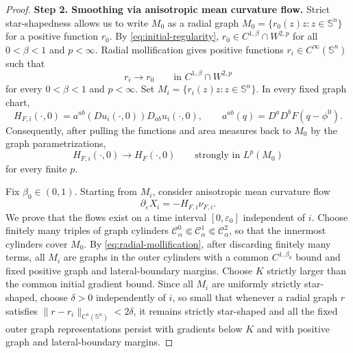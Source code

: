 \documentclass[11pt,reqno]{amsart}
\theoremstyle{definition}
\theoremstyle{remark}
\numberwithin{equation}{section}
\begin{document}
\begin{proof}
\medskip
\noindent
\textbf{Step 2. Smoothing via anisotropic mean curvature flow.}
Strict star-shapedness allows us to write $M_0$ as a radial graph $M_0=\{r_0(z)z:z\in\mathbb S^n\}$  for a positive function $r_0$. By \eqref{eq:initial-regularity}, $r_0\in C^{1,\beta}\cap W^{2,p}$ for all $0<\beta<1$ and $p<\infty$. Radial mollification gives positive functions $r_i\in C^\infty(\mathbb S^n)$ such that
\begin{equation}
\label{eq:radial-mollification}
 r_i\longrightarrow r_0
 \qquad\text{in }C^{1,\beta}\cap W^{2,p}
\end{equation}
for every $0<\beta<1$ and $p<\infty$. Set $M_i=\{r_i(z)z:z\in\mathbb S^n\}$. In every fixed graph chart,
\begin{equation*}
 H_{F,i}(\cdot,0)=a^{ab}(Du_i(\cdot,0))D_{ab}u_i(\cdot,0),
 \qquad
 a^{ab}(q)=D^aD^bF(q-\phi^0).
\end{equation*}
Consequently, after pulling the functions and area measures back to $M_0$ by the graph parametrizations,
\begin{equation}
\label{eq:initial-H-strong}
 H_{F,i}(\cdot,0)\longrightarrow H_F(\cdot,0)
 \qquad\text{strongly in }L^p(M_0)
\end{equation}
for every finite $p$.

Fix $\beta_0\in(0,1)$. Starting from $M_i$, consider anisotropic mean curvature flow
\begin{equation*}
 \partial_\varepsilon X_i=-H_{F,i}\nu_{F,i}.
\end{equation*}
We prove that the flows exist on a time interval $[0,\varepsilon_0]$ independent of $i$. Choose finitely many triples of graph cylinders $\mathcal C^0_\alpha\Subset\mathcal C^1_\alpha\Subset\mathcal C^2_\alpha$, so that the innermost cylinders cover $M_0$. By \eqref{eq:radial-mollification}, after discarding finitely many terms, all $M_i$ are graphs in the outer cylinders with a common $C^{1,\beta_0}$ bound and fixed positive graph and lateral-boundary margins. Choose $K$ strictly larger than the common initial gradient bound. Since all $M_i$ are uniformly strictly star-shaped, choose $\delta>0$ independently of $i$, so small that whenever a radial graph $r$ satisfies $\|r-r_i\|_{C^1(\mathbb S^n)}<2\delta$,  it remains strictly star-shaped and all the fixed outer graph representations persist with gradients below $K$ and with positive graph and lateral-boundary margins.


\end{proof}
\end{document}
